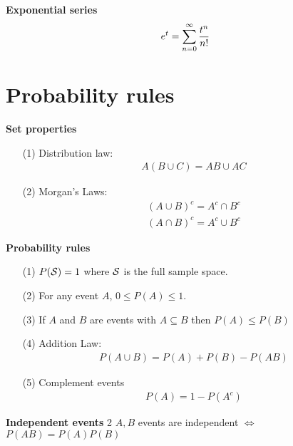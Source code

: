 \documentclass[16pt,a4paper]{article}
\begin{document}
\begin{thm}{\textbf{Exponential series}}
    \begin{align*}
        e^t = \sum\limits_{n=0}^{\infty}\frac{t^n}{n!}
    \end{align*}
\end{thm}
\newpage
\section{Probability rules}
\begin{thm}{\textbf{Set properties}}
    \begin{enumerate}
        \item[(1)] Distribution law: 
            \begin{align*}
                A(B \cup C) = AB \cup AC
            \end{align*} 
        \item[(2)] Morgan’s Laws: 
            \begin{align*}
                (A\cup B)^c = A^c \cap B^c \\
                (A\cap B)^c = A^c \cup B^c
            \end{align*}
    \end{enumerate}
\end{thm}
\begin{defn}{\textbf{Probability rules}}
    \begin{enumerate}
        \item[(1)] $P({\cal S}) = 1$ where $\cal S$ is the full sample space. 
        \item[(2)] For any event $A$, $0 \leq P(A) \leq 1$. 
        \item[(3)] If $A$ and $B$ are events with $A\subseteq B$ then $P(A) \leq P(B)$
        \item[(4)] Addition Law: 
            \begin{align*}
                P(A \cup B) = P(A) + P(B) - P(AB)
            \end{align*}
        \item[(5)] Complement events
            \begin{align*}
                P(A) = 1-P(A^c)
            \end{align*}
    \end{enumerate}
\end{defn}

\begin{defn}{\textbf{Independent events}}
    2 $A,B$ events are independent $\iff$ $P(AB) = P(A)P(B)$
\end{defn}
\end{document}
